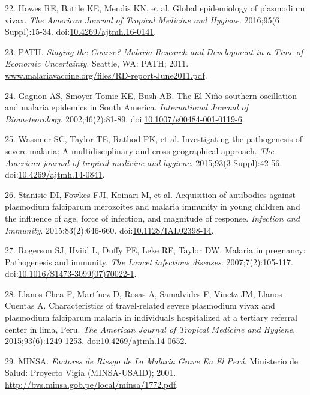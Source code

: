 \documentclass[a4paper]{article}
\begin{document}
\hypertarget{ref-howes2016global}{}
22. Howes RE, Battle KE, Mendis KN, et al. Global epidemiology of
plasmodium vivax. \emph{The American Journal of Tropical Medicine and
Hygiene}. 2016;95(6 Suppl):15-34.
doi:\href{https://doi.org/10.4269/ajtmh.16-0141}{10.4269/ajtmh.16-0141}.

\hypertarget{ref-path2011}{}
23. PATH. \emph{Staying the Course? Malaria Research and Development in
a Time of Economic Uncertainty}. Seattle, WA: PATH; 2011.
\url{www.malariavaccine.org/files/RD-report-June2011.pdf}.

\hypertarget{ref-gagnon2002enso}{}
24. Gagnon AS, Smoyer-Tomic KE, Bush AB. The El Niño southern
oscillation and malaria epidemics in South America. \emph{International
Journal of Biometeorology}. 2002;46(2):81-89.
doi:\href{https://doi.org/10.1007/s00484-001-0119-6}{10.1007/s00484-001-0119-6}.

\hypertarget{ref-wassmer2015}{}
25. Wassmer SC, Taylor TE, Rathod PK, et al. Investigating the
pathogenesis of severe malaria: A multidisciplinary and
cross-geographical approach. \emph{The American journal of tropical
medicine and hygiene}. 2015;93(3 Suppl):42-56.
doi:\href{https://doi.org/10.4269/ajtmh.14-0841}{10.4269/ajtmh.14-0841}.

\hypertarget{ref-Stanisic2015}{}
26. Stanisic DI, Fowkes FJI, Koinari M, et al. Acquisition of antibodies
against plasmodium falciparum merozoites and malaria immunity in young
children and the influence of age, force of infection, and magnitude of
response. \emph{Infection and Immunity}. 2015;83(2):646-660.
doi:\href{https://doi.org/10.1128/IAI.02398-14}{10.1128/IAI.02398-14}.

\hypertarget{ref-rogerson2007preg}{}
27. Rogerson SJ, Hviid L, Duffy PE, Leke RF, Taylor DW. Malaria in
pregnancy: Pathogenesis and immunity. \emph{The Lancet infectious
diseases}. 2007;7(2):105-117.
doi:\href{https://doi.org/10.1016/S1473-3099(07)70022-1}{10.1016/S1473-3099(07)70022-1}.

\hypertarget{ref-llanoschea2015}{}
28. Llanos-Chea F, Martínez D, Rosas A, Samalvides F, Vinetz JM,
Llanos-Cuentas A. Characteristics of travel-related severe plasmodium
vivax and plasmodium falciparum malaria in individuals hospitalized at a
tertiary referral center in lima, Peru. \emph{The American Journal of
Tropical Medicine and Hygiene}. 2015;93(6):1249-1253.
doi:\href{https://doi.org/10.4269/ajtmh.14-0652}{10.4269/ajtmh.14-0652}.

\hypertarget{ref-factores2001}{}
29. MINSA. \emph{Factores de Riesgo de La Malaria Grave En El Perú}.
Ministerio de Salud: Proyecto Vigía (MINSA-USAID); 2001.
\url{http://bvs.minsa.gob.pe/local/minsa/1772.pdf}.
\end{document}
